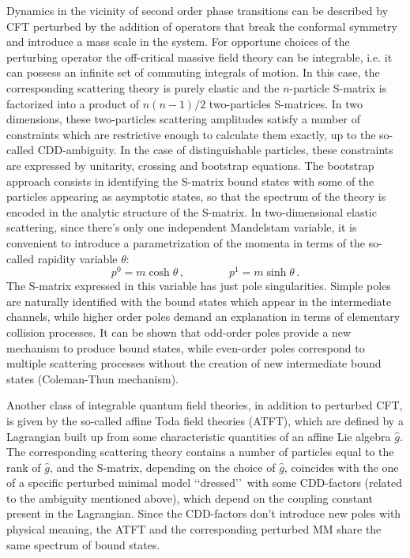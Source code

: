 \documentclass[a4paper,12pt]{report}
\begin{document}
\vspace{0.5cm}

Dynamics in the vicinity of second order phase transitions can be described by CFT perturbed by the addition of
operators that break the conformal symmetry and introduce a mass scale in the system. For opportune choices of the
perturbing operator the off-critical massive field theory can be integrable, i.e. it can possess an infinite set
of commuting integrals of motion. In this case, the corresponding scattering theory is purely elastic and the
$n$-particle S-matrix is factorized into a product of $n(n-1)/2$ two-particles S-matrices. In two dimensions,
these two-particles scattering amplitudes satisfy a number of constraints which are restrictive enough to
calculate them exactly, up to the so-called CDD-ambiguity. In the case of distinguishable particles, these
constraints are expressed by unitarity, crossing and bootstrap equations. The bootstrap approach consists in
identifying the S-matrix bound states with some of the particles appearing as asymptotic states, so that the
spectrum of the theory is encoded in the analytic structure of the S-matrix. In two-dimensional elastic
scattering, since there's only one independent Mandelstam variable, it is convenient to introduce a
parametrization of the momenta in terms of the so-called rapidity variable $\theta$:
\begin{displaymath}
p^{0}=m\cosh\theta\,,\qquad\qquad p^{1}=m\sinh\theta \,.
\end{displaymath}
The S-matrix expressed in this variable has just pole singularities. Simple poles are naturally identified with
the bound states which appear in the intermediate channels, while higher order poles demand an explanation in
terms of elementary collision processes. It can be shown that odd-order poles provide a new mechanism to produce
bound states, while even-order poles correspond to multiple scattering processes without the creation of new
intermediate bound states (Coleman-Thun mechanism).

Another class of integrable quantum field theories, in addition to perturbed CFT, is given by the so-called affine
Toda field theories (ATFT), which are defined by a Lagrangian built up from some characteristic quantities of an
affine Lie algebra $\hat{g}$. The corresponding scattering theory contains a number of particles equal to the
rank of $\hat{g}$, and the S-matrix, depending on the choice of $\hat{g}$, coincides with the one of a specific
perturbed minimal model \lq\lq dressed\rq\rq \, with some CDD-factors (related to the ambiguity mentioned above),
which depend on the coupling constant present in the Lagrangian. Since the CDD-factors don't introduce new poles
with physical meaning, the ATFT and the corresponding perturbed MM share the same spectrum of bound states.
\end{document}
